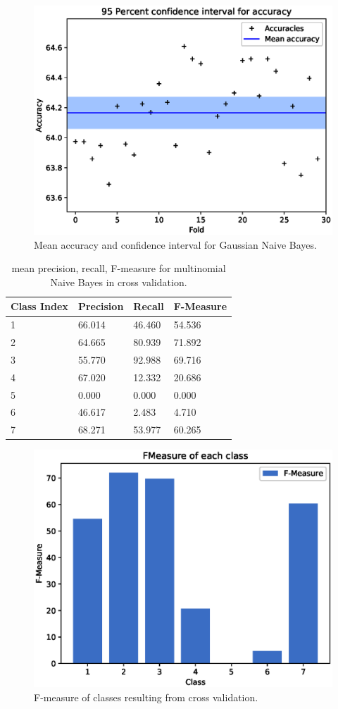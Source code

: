\documentclass[a4paper, 10pt]{article}
\begin{document}
\begin{figure}[H]
 \centering
 \includegraphics[width=0.8\linewidth]{pictures/nb_multi_accuracy_interval.eps}
 \caption{Mean accuracy and confidence interval for Gaussian Naive Bayes.}
 \label{fig:acc_int_mnb}
\end{figure}

\begin{table}[H]
\centering
\begin{tabular}{|l|l|l|l|}
\hline
\textbf{Class Index} & \textbf{Precision} & \textbf{Recall} & \textbf{F-Measure}\\\hline
1 & 66.014 & 46.460& 54.536\\\hline
2 & 64.665 & 80.939& 71.892\\\hline
3 & 55.770 & 92.988& 69.716\\\hline
4 & 67.020 & 12.332& 20.686\\\hline
5 & 0.000 & 0.000& 0.000\\\hline
6 & 46.617 & 2.483& 4.710\\\hline
7 & 68.271 & 53.977& 60.265\\\hline
\end{tabular}
\caption{mean precision, recall, F-measure for multinomial Naive Bayes in cross validation.}
\label{tab:mnb_cross_pr}
\end{table}
\begin{figure}[H]
 \centering
 \includegraphics[width=0.8\linewidth]{pictures/nb_multi_fmeasure.eps}
 \caption{F-measure of classes resulting from cross validation.}
 \label{fig:mnb_fmeasure}
\end{figure}
\end{document}
